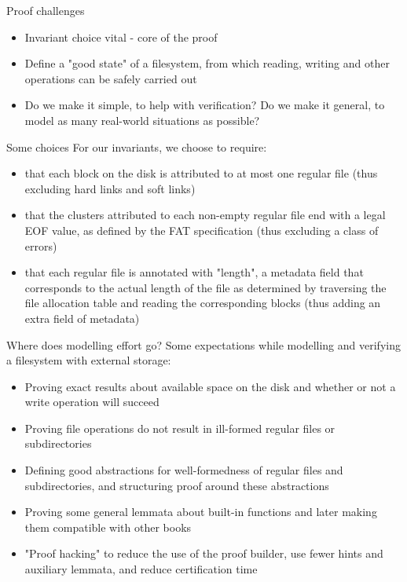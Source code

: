 \documentclass{beamer}
\begin{document}
\begin{frame}{Proof challenges}
  \begin{itemize}
  \item Invariant choice vital - core of the proof
  \item Define a "good state" of a filesystem, from which reading,
    writing and other operations can be safely carried out
  \item Do we make it simple, to help with verification? Do we make it
    general, to model as many real-world situations as possible?
  \end{itemize}
\end{frame}

\begin{frame}{Some choices}
  For our invariants, we choose to require:
    \begin{itemize}
    \item that each block on the disk is attributed to at most one
      regular file {\color[rgb]{0,0,1} (thus excluding hard links and
        soft links)}
    \item that the clusters attributed to each non-empty regular file
      end with a legal EOF value, as defined by the FAT specification
      {\color[rgb]{0,0,1} (thus excluding a class of errors)}
    \item that each regular file is annotated with "length", a
      metadata field that corresponds to the actual length of the file
      as determined by traversing the file allocation table and
      reading the corresponding blocks {\color[rgb]{0,0,1} (thus
        adding an extra field of metadata)}
    \end{itemize}
\end{frame}

\begin{frame}{Where does modelling effort go?}
  Some expectations while modelling and verifying a filesystem with external storage:
  \begin{itemize}
  \item Proving exact results about available space on the disk and
    whether or not a write operation will succeed
  \item Proving file operations do not result in ill-formed regular
    files or subdirectories
  \item Defining good abstractions for well-formedness of regular
    files and subdirectories, and structuring proof around these
    abstractions
  \item Proving some general lemmata about built-in functions and
    later making them compatible with other books
  \item "Proof hacking" to reduce the use of the proof builder, use
    fewer hints and auxiliary lemmata, and reduce certification time
  \end{itemize}
\end{frame}
\end{document}
